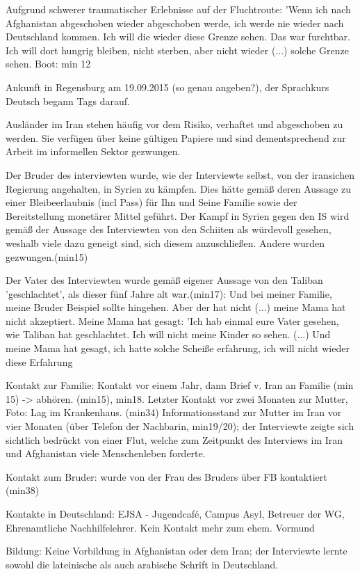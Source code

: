 Aufgrund schwerer traumatischer Erlebnisse auf der Fluchtroute: 'Wenn ich nach Afghanistan abgeschoben wieder abgeschoben werde, ich werde nie wieder nach Deutschland kommen. Ich will die wieder diese Grenze sehen. Das war furchtbar. Ich will dort hungrig bleiben, nicht sterben, aber nicht wieder (...) solche Grenze sehen. 
Boot: min 12

Ankunft in Regensburg am 19.09.2015 (so genau angeben?), der Sprachkurs Deutsch begann Tags darauf.

Ausländer im Iran stehen häufig vor dem Risiko, verhaftet und abgeschoben zu werden. Sie verfügen über keine gültigen Papiere und sind dementsprechend  zur Arbeit im informellen Sektor gezwungen.

Der Bruder des interviewten wurde, wie der Interviewte selbst, von der iransichen Regierung angehalten, in Syrien zu kämpfen. Dies hätte gemäß deren Aussage zu einer Bleibeerlaubnis (incl Pass) für Ihn und Seine Familie sowie der Bereitstellung monetärer Mittel geführt.
Der Kampf in Syrien gegen den IS wird gemäß der Aussage des Interviewten von den Schiiten als würdevoll gesehen, weshalb viele dazu geneigt sind, sich diesem anzuschließen. Andere wurden gezwungen.(min15)

Der Vater des Interviewten wurde gemäß eigener Aussage von den Taliban 'geschlachtet', als dieser fünf Jahre alt war.(min17): Und bei meiner Familie, meine Bruder Beispiel sollte hingehen. Aber der hat nicht (...) meine Mama hat nicht akzeptiert. Meine Mama hat gesagt: 'Ich hab einmal eure Vater gesehen, wie Taliban hat geschlachtet. Ich will nicht meine Kinder so sehen. (...) Und meine Mama hat gesagt, ich hatte solche Scheiße erfahrung, ich will nicht wieder diese Erfahrung 

Kontakt zur Familie: Kontakt vor einem Jahr, dann Brief v. Iran an Familie (min 15) -> abhören. (min15), min18. 
Letzter Kontakt vor zwei Monaten zur Mutter, Foto: Lag im Krankenhaus. (min34) 
Informationsstand zur Mutter im Iran vor vier Monaten (über Telefon der Nachbarin, min19/20); der Interviewte zeigte sich sichtlich bedrückt von einer
Flut, welche zum Zeitpunkt des Interviews im Iran und Afghanistan viele Menschenleben forderte.

Kontakt zum Bruder: wurde von der Frau des Bruders über FB kontaktiert (min38)

Kontakte in Deutschland: EJSA - Jugendcafé, Campus Asyl, Betreuer der WG, Ehrenamtliche Nachhilfelehrer. Kein Kontakt mehr zum ehem. Vormund

Bildung: Keine Vorbildung in Afghanistan oder dem Iran; der Interviewte lernte sowohl die lateinische als auch arabische Schrift in Deutschland.

